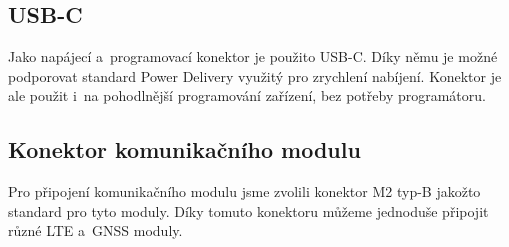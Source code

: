 \subsection{USB-C}
Jako napájecí a~programovací konektor je použito USB-C.
Díky němu je možné podporovat standard Power Delivery využitý pro zrychlení nabíjení.
Konektor je ale použit i~na pohodlnější programování zařízení, bez potřeby programátoru.

\subsection{Konektor komunikačního modulu}
Pro připojení komunikačního modulu jsme zvolili konektor M2 typ-B jakožto standard pro tyto moduly.
Díky tomuto konektoru můžeme jednoduše připojit různé LTE a~GNSS moduly.










